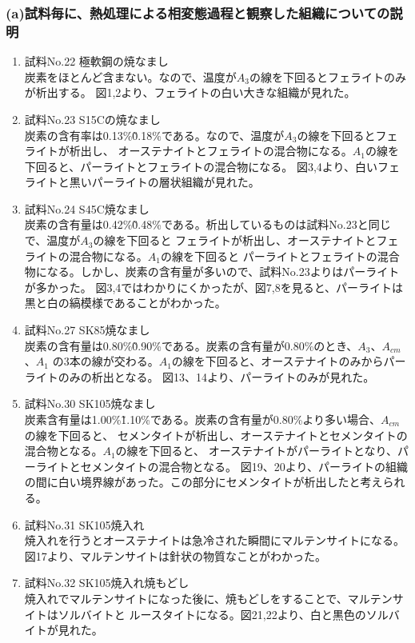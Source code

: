 \documentclass[10pt,a4j]{jsarticle}
\begin{document}
    \subsubsection{(a)試料毎に、熱処理による相変態過程と観察した組織についての説明}
      \begin{enumerate}
        \item 試料No.22 極軟鋼の焼なまし \\
          炭素をほとんど含まない。なので、温度が$A_{3}$の線を下回るとフェライトのみが析出する。
          図1,2より、フェライトの白い大きな組織が見れた。
        \item 試料No.23 S15Cの焼なまし \\
          炭素の含有率は0.13\%\~0.18\%である。なので、温度が$A_{3}$の線を下回るとフェライトが析出し、
          オーステナイトとフェライトの混合物になる。$A_{1}$の線を下回ると、パーライトとフェライトの混合物になる。
          図3,4より、白いフェライトと黒いパーライトの層状組織が見れた。
        \item 試料No.24 S45C焼なまし \\
          炭素の含有量は0.42\%\~0.48\%である。析出しているものは試料No.23と同じで、温度が$A_{3}$の線を下回ると
          フェライトが析出し、オーステナイトとフェライトの混合物になる。$A_{1}$の線を下回ると
          パーライトとフェライトの混合物になる。しかし、炭素の含有量が多いので、試料No.23よりはパーライトが多かった。
          図3,4ではわかりにくかったが、図7,8を見ると、パーライトは黒と白の縞模様であることがわかった。
        \item 試料No.27 SK85焼なまし \\
          炭素の含有量は0.80\%\~0.90\%である。炭素の含有量が0.80\%のとき、$A_{3}$、$A_{cm}$、$A_{1}$
          の3本の線が交わる。$A_{1}$の線を下回ると、オーステナイトのみからパーライトのみの析出となる。
          図13、14より、パーライトのみが見れた。
        \item 試料No.30 SK105焼なまし \\
          炭素含有量は1.00\%\~1.10\%である。炭素の含有量が0.80\%より多い場合、$A_{cm}$の線を下回ると、
          セメンタイトが析出し、オーステナイトとセメンタイトの混合物となる。$A_{1}$の線を下回ると、
          オーステナイトがパーライトとなり、パーライトとセメンタイトの混合物となる。
          図19、20より、パーライトの組織の間に白い境界線があった。この部分にセメンタイトが析出したと考えられる。  
        \item 試料No.31 SK105焼入れ \\
          焼入れを行うとオーステナイトは急冷された瞬間にマルテンサイトになる。
          図17より、マルテンサイトは針状の物質なことがわかった。
        \item 試料No.32 SK105焼入れ焼もどし \\
          焼入れでマルテンサイトになった後に、焼もどしをすることで、マルテンサイトはソルバイトと
          ルースタイトになる。図21,22より、白と黒色のソルバイトが見れた。
      \end{enumerate}
\end{document}
